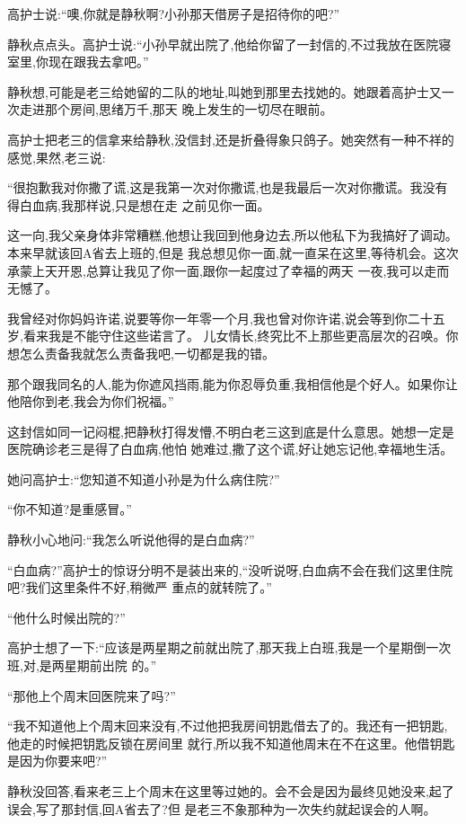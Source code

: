 ﻿\documentclass[12pt]{article}
\begin{document}
高护士说:``噢,你就是静秋啊?小孙那天借房子是招待你的吧?''

静秋点点头。高护士说:``小孙早就出院了,他给你留了一封信的,不过我放在医院寝室里,你现在跟我去拿吧。''

静秋想,可能是老三给她留的二队的地址,叫她到那里去找她的。她跟着高护士又一次走进那个房间,思绪万千,那天
晚上发生的一切尽在眼前。

高护士把老三的信拿来给静秋,没信封,还是折叠得象只鸽子。她突然有一种不祥的感觉,果然,老三说:

``很抱歉我对你撒了谎,这是我第一次对你撒谎,也是我最后一次对你撒谎。我没有得白血病,我那样说,只是想在走
之前见你一面。

这一向,我父亲身体非常糟糕,他想让我回到他身边去,所以他私下为我搞好了调动。本来早就该回A省去上班的,但是
我总想见你一面,就一直呆在这里,等待机会。这次承蒙上天开恩,总算让我见了你一面,跟你一起度过了幸福的两天
一夜,我可以走而无憾了。

我曾经对你妈妈许诺,说要等你一年零一个月,我也曾对你许诺,说会等到你二十五岁,看来我是不能守住这些诺言了。
儿女情长,终究比不上那些更高层次的召唤。你想怎么责备我就怎么责备我吧,一切都是我的错。

那个跟我同名的人,能为你遮风挡雨,能为你忍辱负重,我相信他是个好人。如果你让他陪你到老,我会为你们祝福。''

这封信如同一记闷棍,把静秋打得发懵,不明白老三这到底是什么意思。她想一定是医院确诊老三是得了白血病,他怕
她难过,撒了这个谎,好让她忘记他,幸福地生活。

她问高护士:``您知道不知道小孙\myrule 是为什么病住院?''

``你不知道?是重感冒。''

静秋小心地问:``我怎么听说他得的是\myrule 白血病?''

``白血病?''高护士的惊讶分明不是装出来的,``没听说呀,白血病不会在我们这里住院吧?我们这里条件不好,稍微严
重点的就转院了。''

``他什么时候出院的?''

高护士想了一下:``应该是两星期之前就出院了,那天我上白班,我是一个星期倒一次班\myrule ,对,是两星期前出院
的。''

``那他\myrule 上个周末\myrule 回医院来了吗?''

``我不知道他上个周末回来没有,不过他把我房间钥匙借去了的。我还有一把钥匙,他走的时候把钥匙反锁在房间里
就行,所以我不知道他周末在不在这里。他借钥匙是因为\myrule 你要来吧?''

静秋没回答,看来老三上个周末在这里等过她的。会不会是因为最终见她没来,起了误会,写了那封信,回A省去了?但
是老三不象那种为一次失约就起误会的人啊。
\end{document}
